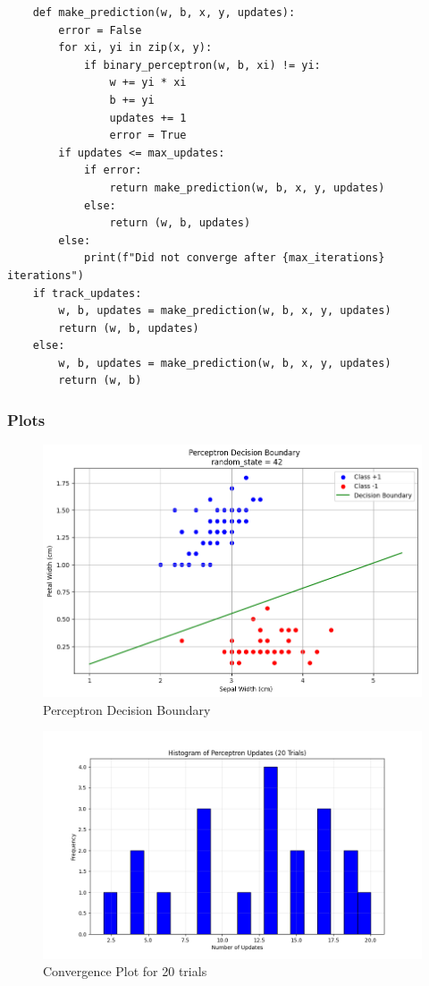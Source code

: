 \documentclass{article}
\begin{document}
{\begin{lstlisting}
    def make_prediction(w, b, x, y, updates):
        error = False    
        for xi, yi in zip(x, y):
            if binary_perceptron(w, b, xi) != yi:
                w += yi * xi
                b += yi
                updates += 1
                error = True  
        if updates <= max_updates:
            if error:
                return make_prediction(w, b, x, y, updates) 
            else:
                return (w, b, updates)
        else:
            print(f"Did not converge after {max_iterations} iterations")
    if track_updates:
        w, b, updates = make_prediction(w, b, x, y, updates)
        return (w, b, updates)
    else:
        w, b, updates = make_prediction(w, b, x, y, updates)
        return (w, b)

\end{lstlisting}
\subsubsection*{Plots}
\begin{figure}[H]
\includegraphics[width=1\textwidth]{hw6_q7_c.png} 
\caption{Perceptron Decision Boundary}
\end{figure}

\begin{figure}[H]
\includegraphics[width=1\textwidth]{hw6_q7_d.png} 
\caption{Convergence Plot for 20 trials} 
\end{figure}

}
\end{document}
